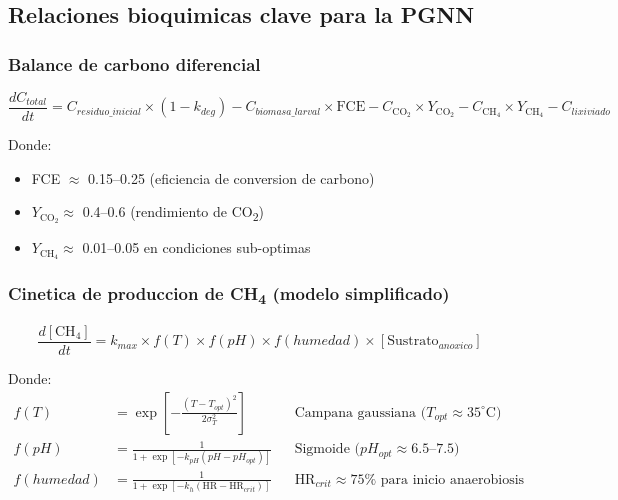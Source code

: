 \documentclass[12pt]{article}
\begin{document}
\subsection{Relaciones bioquimicas clave para la PGNN}

\subsubsection{Balance de carbono diferencial}

\begin{equation}
\frac{dC_{total}}{dt} = C_{residuo\_inicial} \times (1 - k_{deg}) - C_{biomasa\_larval} \times \text{FCE} - C_{\text{CO}_2} \times Y_{\text{CO}_2} - C_{\text{CH}_4} \times Y_{\text{CH}_4} - C_{lixiviado}
\end{equation}

Donde:
\begin{itemize}
\item FCE $\approx$ 0.15--0.25 (eficiencia de conversion de carbono)
\item $Y_{\text{CO}_2} \approx$ 0.4--0.6 (rendimiento de CO\textsubscript{2})
\item $Y_{\text{CH}_4} \approx$ 0.01--0.05 en condiciones sub-optimas
\end{itemize}

\subsubsection{\texorpdfstring{Cinetica de produccion de CH\textsubscript{4} (modelo simplificado)}{Cinetica de produccion de CH4 (modelo simplificado)}}

\begin{equation}
\frac{d[\text{CH}_4]}{dt} = k_{max} \times f(T) \times f(pH) \times f(humedad) \times [\text{Sustrato}_{anoxico}]
\end{equation}

Donde:
\begin{align*}
f(T) &= \exp\left[-\frac{(T - T_{opt})^2}{2\sigma_T^2}\right] && \text{Campana gaussiana ($T_{opt} \approx 35^\circ\text{C}$)} \\
f(pH) &= \frac{1}{1 + \exp[-k_{pH}(pH - pH_{opt})]} && \text{Sigmoide ($pH_{opt} \approx 6.5$--$7.5$)} \\
f(humedad) &= \frac{1}{1 + \exp[-k_h(\text{HR} - \text{HR}_{crit})]} && \text{HR}_{crit} \approx 75\% \text{ para inicio anaerobiosis}
\end{align*}
\end{document}
